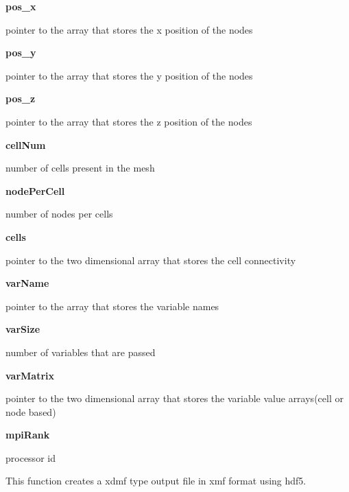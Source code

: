 \documentclass{article}
\begin{document}
        {\bf pos\_x} \par pointer to the array that stores the x position of the nodes
\medskip
        
        {\bf pos\_y} \par pointer to the array that stores the y position of the nodes
\medskip
        
        {\bf pos\_z} \par pointer to the array that stores the z position of the nodes
\medskip
        
        {\bf cellNum} \par number of cells present in the mesh
\medskip
        
        {\bf nodePerCell} \par number of nodes per cells 
\medskip
        
        {\bf cells} \par pointer to the two dimensional array that stores the cell connectivity
\medskip
        
        {\bf varName} \par pointer to the array that stores the variable names
\medskip
        
        {\bf varSize} \par number of variables that are passed 
\medskip
        
        {\bf varMatrix} \par pointer to the two dimensional array that stores the variable value arrays(cell or node based) 
\medskip
        
        {\bf mpiRank} \par processor id

\newpage

\bigskip

        \par This function creates a xdmf type output file in xmf format using hdf5.
\bigskip
        
\end{document}
